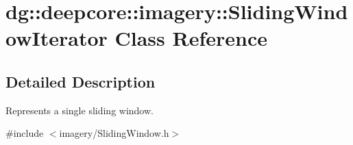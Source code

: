 \hypertarget{classdg_1_1deepcore_1_1imagery_1_1_sliding_window_iterator}{}\section{dg\+:\+:deepcore\+:\+:imagery\+:\+:Sliding\+Window\+Iterator Class Reference}
\label{classdg_1_1deepcore_1_1imagery_1_1_sliding_window_iterator}


\subsection{Detailed Description}
Represents a single sliding window. 

{\ttfamily \#include $<$imagery/\+Sliding\+Window.\+h$>$}

